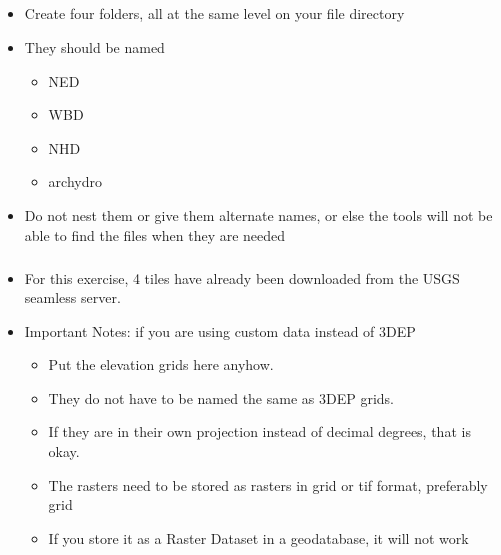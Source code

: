 \documentclass[letterpaper,10pt,english]{sphinxmanual}
\begin{document}
\subparagraph{}
\label{\detokenize{ex_1:file-structure}}\begin{itemize}
\item {} 
Create four folders, all at the same level on your file directory

\item {} 
They should be named
\begin{itemize}
\item {} 
NED

\item {} 
WBD

\item {} 
NHD

\item {} 
archydro

\end{itemize}

\item {} 
Do not nest them or give them alternate names, or else the tools will not be able to find the files when they are needed

\end{itemize}


\subparagraph{}
\label{\detokenize{ex_1:ned}}\begin{itemize}
\item {} 
For this exercise, 4 tiles have already been downloaded from the USGS seamless server.

\item {} 
Important Notes: if you are using custom data instead of 3DEP
\begin{itemize}
\item {} 
Put the elevation grids here anyhow.

\item {} 
They do not have to be named the same as 3DEP grids.

\item {} 
If they are in their own projection instead of decimal degrees, that is okay.

\item {} 
The rasters need to be stored as rasters in grid or tif format, preferably grid

\item {} 
If you store it as a Raster Dataset in a geodatabase, it will not work

\end{itemize}

\end{itemize}
\end{document}

